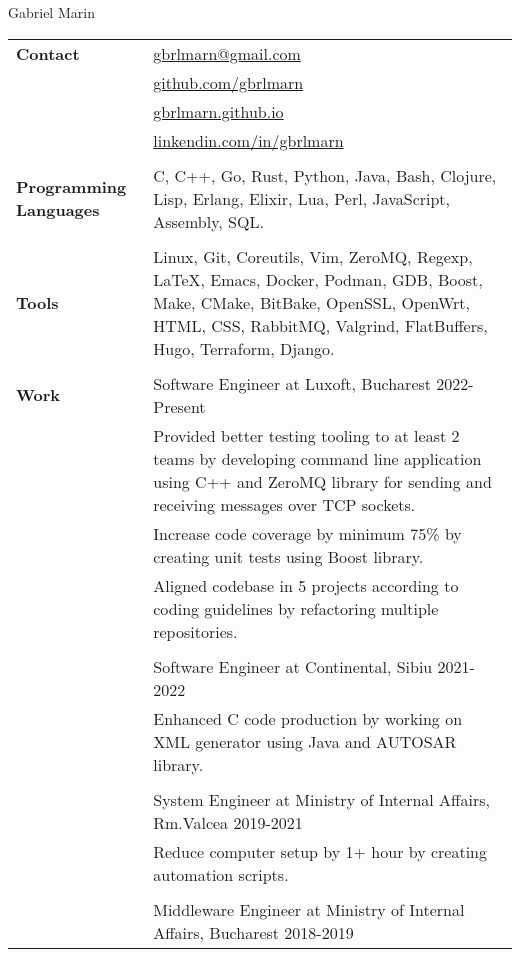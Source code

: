 \documentclass[a4paper,12pt]{article}
\newcommand{\body}[1]{
    \begin{tabular}{>{\raggedleft\bfseries\arraybackslash}p{3cm}|>{\raggedright\arraybackslash}p{15cm}}
        #1
    \end{tabular}
}
\begin{document}
\par {
  {\Huge Gabriel Marin}
  \bigskip
}

\body{
    Contact
    &\href{mailto:gbrlmarn@gmail.com}{\faicon{envelope} gbrlmarn@gmail.com}\\
    &\href{https://github.com/gbrlmarn}{\faicon{github} github.com/gbrlmarn}\\
    &\href{https://gbrlmarn.github.io}{\faicon{globe} gbrlmarn.github.io}\\
    &\href{https://linkedin.com/in/gbrlmarn}{\faicon{linkedin} linkendin.com/in/gbrlmarn}\\
    \\
Programming Languages & C, C++, Go, Rust, Python, Java, Bash, Clojure, Lisp, Erlang, Elixir, Lua, Perl, JavaScript, Assembly, SQL. \\
\\
Tools & Linux, Git, Coreutils, Vim, ZeroMQ, Regexp, \LaTeX, Emacs, Docker, Podman, GDB, Boost, Make, CMake, BitBake, OpenSSL, OpenWrt, HTML, CSS, RabbitMQ, Valgrind, FlatBuffers, Hugo, Terraform, Django. \\
\\
  Work & Software Engineer at Luxoft, Bucharest 2022-Present \\
  &\footnotesize{Provided better testing tooling to at least 2 teams by developing command line application using C++ and ZeroMQ library for sending and receiving messages over TCP sockets.}\\
  &\footnotesize{Increase code coverage by minimum 75\% by creating unit tests using Boost library.}\\
  &\footnotesize{Aligned codebase in 5 projects according to coding guidelines by refactoring multiple repositories.}\\
  \\
  &Software Engineer at Continental, Sibiu 2021-2022 \\
  &\footnotesize{Enhanced C code production by working on XML generator using Java and AUTOSAR library.}\\
  \\
  & System Engineer at Ministry of Internal Affairs, Rm.Valcea 2019-2021 \\
  &\footnotesize{Reduce computer setup by 1+ hour by creating automation scripts.}\\
  \\
  & Middleware Engineer at Ministry of Internal Affairs, Bucharest 2018-2019 \\
}
\end{document}
